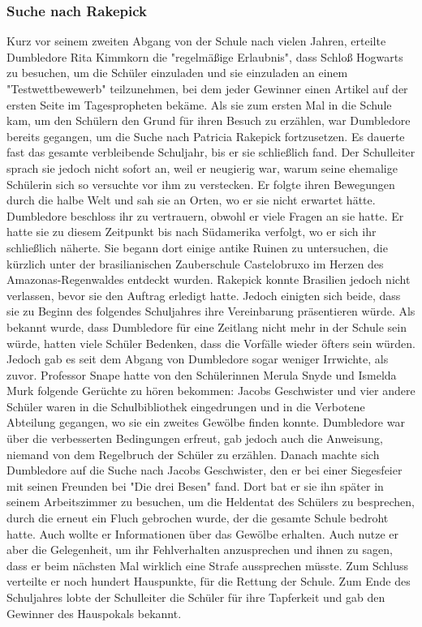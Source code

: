 \documentclass[a4paper, 10pt]{article}
\begin{document}
\subsubsection*{Suche nach Rakepick}
Kurz vor seinem zweiten Abgang von der Schule nach vielen Jahren, erteilte Dumbledore Rita Kimmkorn die "regelmäßige Erlaubnis", dass Schloß Hogwarts zu besuchen, um die Schüler einzuladen und sie einzuladen an einem "Testwettbewewerb" teilzunehmen, bei dem jeder Gewinner einen Artikel auf der ersten Seite im Tagespropheten bekäme. Als sie zum ersten Mal in die Schule kam, um den Schülern den Grund für ihren Besuch zu erzählen, war Dumbledore bereits gegangen, um die Suche nach Patricia Rakepick fortzusetzen. Es dauerte fast das gesamte verbleibende Schuljahr, bis er sie schließlich fand. Der Schulleiter
sprach sie jedoch nicht sofort an, weil er neugierig war, warum seine ehemalige Schülerin sich so versuchte vor ihm zu verstecken. Er folgte ihren Bewegungen durch die halbe Welt und sah sie an Orten, wo er sie nicht erwartet hätte. Dumbledore beschloss ihr zu vertrauern, obwohl er viele Fragen an sie hatte. Er hatte sie zu diesem Zeitpunkt bis nach Südamerika verfolgt, wo er sich ihr schließlich näherte. Sie begann dort einige antike Ruinen zu untersuchen, die kürzlich unter der brasilianischen Zauberschule Castelobruxo im Herzen des Amazonas-Regenwaldes entdeckt wurden. Rakepick konnte Brasilien jedoch nicht verlassen, bevor sie den Auftrag erledigt hatte. Jedoch einigten sich beide, dass sie zu Beginn des folgendes Schuljahres ihre Vereinbarung präsentieren würde.
\vspace{10pt}
\newline
{}  
Als bekannt wurde, dass Dumbledore für eine Zeitlang nicht mehr in der Schule sein würde, hatten viele Schüler Bedenken, dass die Vorfälle wieder öfters sein würden. Jedoch gab es seit dem Abgang von Dumbledore sogar weniger Irrwichte, als zuvor. Professor Snape hatte von den Schülerinnen Merula Snyde und Ismelda Murk folgende Gerüchte zu hören bekommen: Jacobs Geschwister und vier andere Schüler waren in die Schulbibliothek eingedrungen und in die Verbotene Abteilung gegangen, wo sie ein zweites Gewölbe finden konnte. Dumbledore war über die verbesserten Bedingungen erfreut, gab jedoch auch die Anweisung, niemand von dem Regelbruch der Schüler zu erzählen. Danach machte sich Dumbledore auf die Suche nach Jacobs Geschwister, den er bei einer Siegesfeier mit seinen Freunden bei "Die drei Besen" fand. Dort bat er sie ihn später in seinem Arbeitszimmer zu besuchen, um die Heldentat des Schülers zu besprechen, durch die erneut ein Fluch gebrochen wurde, der die gesamte Schule bedroht hatte. Auch wollte er Informationen über das Gewölbe erhalten. Auch nutze er aber die Gelegenheit, um ihr Fehlverhalten anzusprechen und ihnen zu sagen, dass er beim nächsten Mal wirklich eine Strafe aussprechen müsste. Zum Schluss verteilte er noch hundert Hauspunkte, für die Rettung der Schule.
\vspace{10pt}
\newline
{}  
Zum Ende des Schuljahres lobte der Schulleiter die Schüler für ihre Tapferkeit und gab den Gewinner des Hauspokals bekannt.
\end{document}
